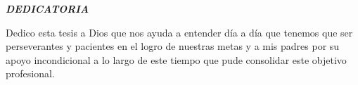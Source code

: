 \newpage
\begin{flushright}
\textbf{\textit{\large DEDICATORIA}}\\[1cm]
\end{flushright}

\begin{flushright}
\begin{minipage}{8cm}
    \noindent
        \large
Dedico esta tesis a Dios que nos ayuda a entender día a día que tenemos que ser perseverantes y pacientes en el logro de nuestras metas y a mis padres por su apoyo incondicional a lo largo de este tiempo que pude consolidar este objetivo profesional.




\end{minipage}
\end{flushright}
